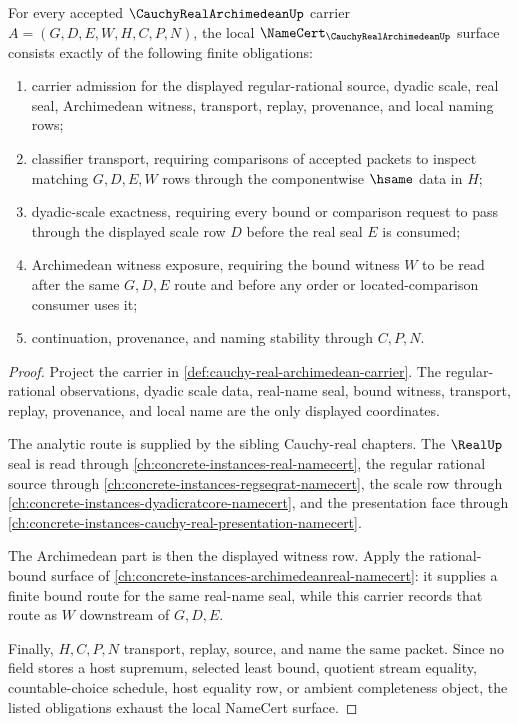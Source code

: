 \begin{theorem}
\label{thm:cauchy-real-archimedean-namecert-obligations}
For every accepted $\CauchyRealArchimedeanUp$ carrier $A=(G,D,E,W,H,C,P,N)$, the local $\NameCert_{\CauchyRealArchimedeanUp}$ surface consists exactly of the following finite obligations:
\begin{enumerate}
\item carrier admission for the displayed regular-rational source, dyadic scale, real seal, Archimedean witness, transport, replay, provenance, and local naming rows;
\item classifier transport, requiring comparisons of accepted packets to inspect matching $G,D,E,W$ rows through the componentwise $\hsame$ data in $H$;
\item dyadic-scale exactness, requiring every bound or comparison request to pass through the displayed scale row $D$ before the real seal $E$ is consumed;
\item Archimedean witness exposure, requiring the bound witness $W$ to be read after the same $G,D,E$ route and before any order or located-comparison consumer uses it;
\item continuation, provenance, and naming stability through $C,P,N$.
\end{enumerate}
\end{theorem}
\begin{proof}
Project the carrier in \autoref{def:cauchy-real-archimedean-carrier}. The regular-rational observations, dyadic scale data, real-name seal, bound witness, transport, replay, provenance, and local name are the only displayed coordinates.

The analytic route is supplied by the sibling Cauchy-real chapters. The $\RealUp$ seal is read through \autoref{ch:concrete-instances-real-namecert}, the regular rational source through \autoref{ch:concrete-instances-regseqrat-namecert}, the scale row through \autoref{ch:concrete-instances-dyadicratcore-namecert}, and the presentation face through \autoref{ch:concrete-instances-cauchy-real-presentation-namecert}.

The Archimedean part is then the displayed witness row. Apply the rational-bound surface of \autoref{ch:concrete-instances-archimedeanreal-namecert}: it supplies a finite bound route for the same real-name seal, while this carrier records that route as $W$ downstream of $G,D,E$.

Finally, $H,C,P,N$ transport, replay, source, and name the same packet. Since no field stores a host supremum, selected least bound, quotient stream equality, countable-choice schedule, host equality row, or ambient completeness object, the listed obligations exhaust the local NameCert surface.
\end{proof}

